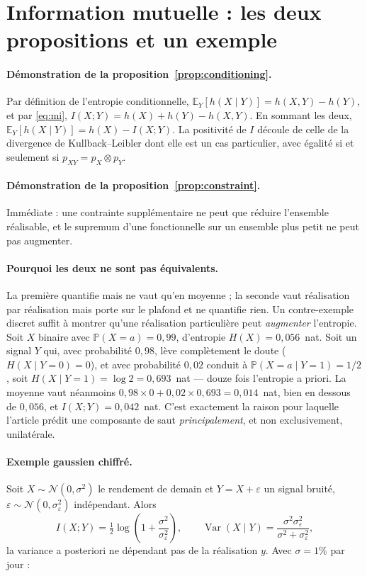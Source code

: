 \documentclass[11pt]{article}
\theoremstyle{definition}
\theoremstyle{remark}
\begin{document}
\section{Information mutuelle : les deux propositions et un exemple}
\label{app:mi}

\paragraph{Démonstration de la proposition~\ref{prop:conditioning}.} Par
définition de l'entropie conditionnelle,
$\mathbb{E}_Y[h(X\mid Y)]=h(X,Y)-h(Y)$, et par
\eqref{eq:mi}, $I(X;Y)=h(X)+h(Y)-h(X,Y)$. En sommant les deux,
$\mathbb{E}_Y[h(X\mid Y)]=h(X)-I(X;Y)$. La positivité de $I$ découle de celle de
la divergence de Kullback--Leibler dont elle est un cas particulier, avec
égalité si et seulement si $p_{XY}=p_X\otimes p_Y$.

\paragraph{Démonstration de la proposition~\ref{prop:constraint}.} Immédiate :
une contrainte supplémentaire ne peut que réduire l'ensemble réalisable, et le
supremum d'une fonctionnelle sur un ensemble plus petit ne peut pas augmenter.

\paragraph{Pourquoi les deux ne sont pas équivalents.} La première quantifie
mais ne vaut qu'en moyenne ; la seconde vaut réalisation par réalisation mais
porte sur le plafond et ne quantifie rien. Un contre-exemple discret suffit à
montrer qu'une réalisation particulière peut \emph{augmenter} l'entropie. Soit
$X$ binaire avec $\mathbb{P}(X=a)=0{,}99$, d'entropie $H(X)=0{,}056$~nat. Soit
un signal $Y$ qui, avec probabilité $0{,}98$, lève complètement le doute
($H(X\mid Y=0)=0$), et avec probabilité $0{,}02$ conduit à
$\mathbb{P}(X=a\mid Y=1)=1/2$, soit $H(X\mid Y=1)=\log 2=0{,}693$~nat --- douze
fois l'entropie a priori. La moyenne vaut néanmoins
$0{,}98\times0+0{,}02\times0{,}693=0{,}014$~nat, bien en dessous de $0{,}056$,
et $I(X;Y)=0{,}042$~nat. C'est exactement la raison pour laquelle l'article
prédit une composante de saut \emph{principalement}, et non exclusivement,
unilatérale.

\paragraph{Exemple gaussien chiffré.} Soit $X\sim\mathcal N(0,\sigma^2)$ le
rendement de demain et $Y=X+\varepsilon$ un signal bruité,
$\varepsilon\sim\mathcal N(0,\sigma_\varepsilon^2)$ indépendant. Alors
\begin{equation}
\label{eq:mi-gauss}
I(X;Y)=\tfrac12\log\!\left(1+\frac{\sigma^2}{\sigma_\varepsilon^2}\right),
\qquad
\operatorname{Var}(X\mid Y)=\frac{\sigma^2\sigma_\varepsilon^2}{\sigma^2+\sigma_\varepsilon^2},
\end{equation}
la variance a posteriori ne dépendant pas de la réalisation $y$. Avec
$\sigma=1\%$ par jour :
\end{document}
